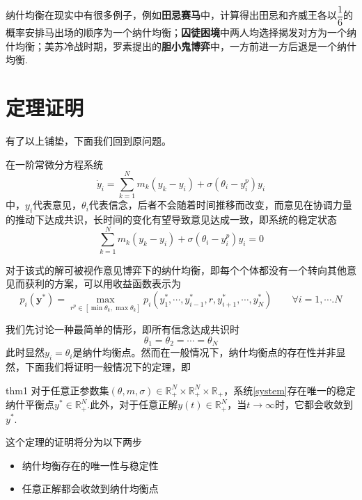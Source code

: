 \documentclass[11pt,a4paper]{article}
\theoremstyle{definition}
\begin{document}
	纳什均衡在现实中有很多例子，例如\textbf{田忌赛马}中，计算得出田忌和齐威王各以$\dfrac{1}{6}$的概率安排马出场的顺序为一个纳什均衡；\textbf{囚徒困境}中两人均选择揭发对方为一个纳什均衡；美苏冷战时期，罗素提出的\textbf{胆小鬼博弈}中，一方前进一方后退是一个纳什均衡.
	
	\section{定理证明}
	有了以上铺垫，下面我们回到原问题。
	
	在一阶常微分方程系统\[ 		\dot{y}_{i}=\sum_{k=1}^{N}m_{k}(y_{k}-y_{i})+\sigma(\theta_{i}-y_{i}^{p})y_{i} \]
	中，$y_{i}$代表意见，$\theta_{i}$代表信念，后者不会随着时间推移而改变，而意见在协调力量的推动下达成共识，长时间的变化有望导致意见达成一致，即系统的稳定状态
	\begin{equation}\label{equality1}
		\sum_{k=1}^{N}m_{k}(y_{k}-y_{i})+\sigma(\theta_{i}-y_{i}^{p})y_{i}=0 
	\end{equation} 
	
	对于该式的解可被视作意见博弈下的纳什均衡，即每个个体都没有一个转向其他意见而获利的方案，可以用收益函数表示为\[ p_{i}(\textbf{y}^{*})=\mathop{max}\limits_{r^{p}\in[\min\theta_{k},\max\theta_{k}]}p_{i}(y_{1}^{*},\cdots,y_{i-1}^{*},r,y_{i+1}^{*},\cdots,y_{N}^{*})\qquad\forall i=1,\cdots.N \]
	
	我们先讨论一种最简单的情形，即所有信念达成共识时
	\begin{equation}\label{equality2}
		\theta_{1}=\theta_{2}=\cdots=\theta_{N}
	\end{equation}  此时显然$y_{i}=\theta_{i}$是纳什均衡点。然而在一般情况下，纳什均衡点的存在性并非显然，下面我们将证明一般情况下的定理，即
	\begin{thm}{}{thm1}
		对于任意正参数集$(\theta,m,\sigma)\in\mathbb{R}_{+}^{N}\times\mathbb{R}_{+}^{N}\times\mathbb{R}_{+}$，系统\ref{system}存在唯一的稳定纳什平衡点$y^{*}\in\mathbb{R}_{+}^{N}$.此外，对于任意正解$y(t)\in\mathbb{R}_{+}^{N}$，当$t\to\infty$时，它都会收敛到$y^{*}$.
	\end{thm}
	
	这个定理的证明将分为以下两步
	\begin{itemize}
		\item 纳什均衡存在的唯一性与稳定性
		\item 任意正解都会收敛到纳什均衡点
	\end{itemize}
\end{document}
